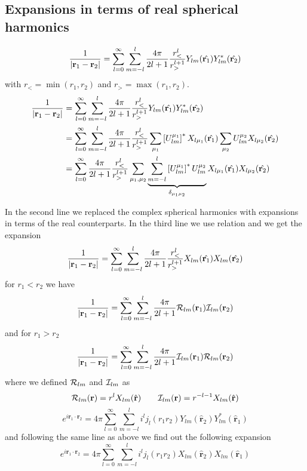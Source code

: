 \subsection[Expansions ...]{Expansions in terms of real spherical harmonics}
\begin{equation}
\frac{1}{|{\bf r}_1-{\bf
    r}_2|}=\sum_{l=0}^{\infty}\sum_{m=-l}^{l}\frac{4\pi}{2l+1}\frac{r_<^l}{r_>^{l+1}}Y_{lm}(\hat{{\bf r}_1})Y_{lm}^{*}(\hat{{\bf r}_2})
\end{equation}
with $r_<=\min (r_1,r_2)$ and $r_>=\max (r_1,r_2)$.
\begin{equation}
\begin{split}
\frac{1}{|{\bf r}_1-{\bf
    r}_2|}&=\sum_{l=0}^{\infty}\sum_{m=-l}^{l}\frac{4\pi}{2l+1}\frac{r_<^l}{r_>^{l+1}}Y_{lm}(\hat{{\bf
    r}_1})Y_{lm}^{*}(\hat{{\bf r}_2})\\
&=\sum_{l=0}^{\infty}\sum_{m=-l}^{l}\frac{4\pi}{2l+1}\frac{r_<^l}{r_>^{l+1}}\sum_{\mu_1}\left[
    U_{lm}^{\mu_1}\right]^{*}X_{l\mu_1}(\hat{{\bf r}_1})\sum_{\mu_2}
    U_{lm}^{\mu_2}X_{l\mu_2}(\hat{{\bf r}_2})\\
&=\sum_{l=0}^{\infty}\frac{4\pi}{2l+1}\frac{r_<^l}{r_>^{l+1}}\sum_{\mu_1,\mu_2}\underbrace{\sum_{m=-l}^{l}\left[
    U_{lm}^{\mu_1}\right]^{*}U_{lm}^{\mu_2}}_{\delta_{\mu_1\mu_2}}X_{l\mu_1}(\hat{{\bf r}_1})X_{l\mu_2}(\hat{{\bf r}_2})
\end{split}
\end{equation}
\par{In the second line we replaced the complex spherical harmonics with expansions
in terms of the real counterparts. In the third line we use relation
 and we get the expansion}
\begin{equation}
\label{rcoulomb}
\frac{1}{|{\bf r}_1-{\bf
    r}_2|}=\sum_{l=0}^{\infty}\sum_{m=-l}^{l}\frac{4\pi}{2l+1}\frac{r_<^l}{r_>^{l+1}}X_{lm}(\hat{{\bf
    r}_1})X_{lm}(\hat{{\bf r}_2})
\end{equation}
for $r_1<r_2$ we have
\begin{equation}
 \frac{1}{|{\bf r}_1-{\bf
    r}_2|}=\sum_{l=0}^{\infty}\sum_{m=-l}^{l}\frac{4\pi}{2l+1}\mathcal{R}_{lm}({\bf
    r}_1)\mathcal{I}_{lm}({\bf r}_2)
\end{equation}
and for $r_1>r_2$
\begin{equation}
 \frac{1}{|{\bf r}_1-{\bf
    r}_2|}=\sum_{l=0}^{\infty}\sum_{m=-l}^{l}\frac{4\pi}{2l+1}\mathcal{I}_{lm}({\bf
    r}_1)\mathcal{R}_{lm}({\bf r}_2)
\end{equation}
where we defined $\mathcal{R}_{lm}$ and $\mathcal{I}_{lm}$ as
\begin{equation}
\mathcal{R}_{lm}({\bf r})=r^lX_{lm}(\hat{{\bf r}})\qquad \mathcal{I}_{lm}({\bf r})=r^{-l-1}X_{lm}(\hat{{\bf r}})
\end{equation}
\begin{equation}
e^{i\bm{r}_1\cdot\bm{r}_2}=4\pi\sum_{l=0}^{\infty}\sum_{m=-l}^{l}i^lj_l(r_1r_2)Y_{lm}(\hat{\bm{r}}_2)Y_{lm}^{*}(\hat{\bm{r}}_1)
\end{equation}
and following the same line as above we find out the following expansion
\begin{equation}
\label{rwave}
e^{i\bm{r}_1\cdot\bm{r}_2}=4\pi\sum_{l=0}^{\infty}\sum_{m=-l}^{l}i^lj_l(r_1r_2)X_{lm}(\hat{\bm{r}}_2)X_{lm}(\hat{\bm{r}}_1)
\end{equation}
